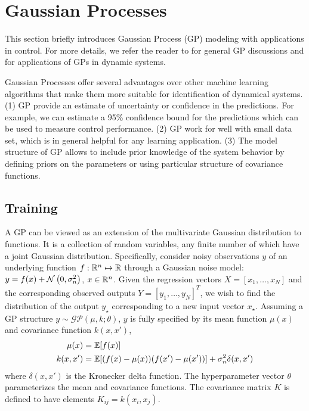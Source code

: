 \section{Gaussian Processes}
\label{S:gp}

This section briefly introduces Gaussian Process (GP) modeling with applications in control.
For more details, we refer the reader to \cite{rasmussen06gaussian} for general GP discussions and \cite{kocijan16modelling} for applications of GPs in  dynamic systems.

Gaussian Processes offer several advantages over other machine learning algorithms that make them more suitable for identification of dynamical systems. (1) GP provide an estimate of uncertainty or confidence in the predictions. For example, we can estimate a 95\% confidence bound for the predictions which can be used to measure control performance. (2) GP work for well with small data set, which is in general helpful for any learning application. (3) The model structure of GP allows to include prior knowledge of the system behavior by defining priors on the parameters or using particular structure of covariance functions.

\subsection{Training}
A GP can be viewed as an extension of the multivariate Gaussian distribution to functions. 
It is a collection of random variables, any finite number of which have a joint Gaussian distribution.
Specifically, consider noisy observations \(y\) of an underlying function \(f: \mathbb{R}^n \mapsto \mathbb{R}\) through a Gaussian noise model: \(y = f(x) + \operatorname*{\mathcal{N}}\left(0, \sigma_n^2\right)\), \(x \in \mathbb{R}^n\).
Given  the regression vectors \(X = [x_1, \dots, x_N]\) and the corresponding observed outputs \(Y = [y_1, \dots, y_N]^T\), we wish to find the  distribution of the output \(y_\star\) corresponding to a new input vector \(x_\star\).
Assuming a GP structure \(y \sim \mathcal{GP}(\mu, k; \theta)\), \(y\) is fully specified by its mean function \(\mu(x)\) and covariance function \(k(x,x')\),
\begin{align*}
\mu(x) &= \mathbb{E} [f(x)] \\
k(x,x') &= \mathbb{E} [(f(x)-\mu(x)) (f(x') - \mu(x'))] + \sigma_n^2 \delta(x,x')
\end{align*}
where \(\delta(x,x')\) is the Kronecker delta function.
The hyperparameter vector \(\theta\) parameterizes the mean and covariance functions.
The covariance matrix \(K\) is defined to have elements \(K_{ij} = k(x_i, x_j)\).

